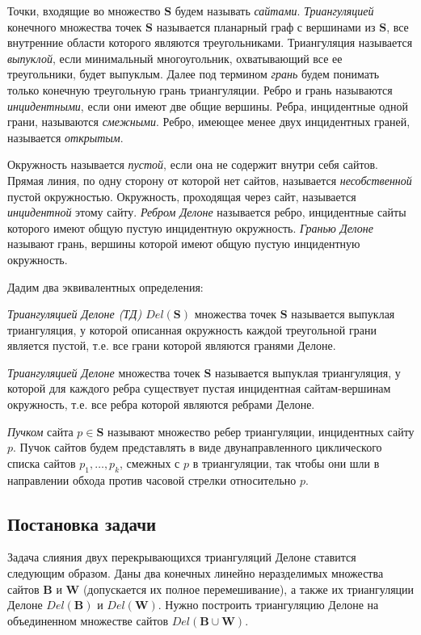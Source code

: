 \documentclass[12pt]{article}
\begin{document}
Точки, входящие во множество $\textbf{S}$ будем называть {\itshape сайтами}.
{\itshape Триангуляцией} конечного множества точек $\textbf{S}$ называется планарный граф с вершинами из $\textbf{S}$,
все внутренние области которого являются треугольниками.
Триангуляция называется {\itshape выпуклой}, если минимальный многоугольник, охватывающий все ее треугольники, будет выпуклым.
Далее под термином {\itshape грань} будем понимать только конечную треугольную грань триангуляции.
Ребро и грань называются {\itshape инцидентными}, если они имеют две общие вершины.
Ребра, инцидентные одной грани, называются {\itshape смежными}.
Ребро, имеющее менее двух инцидентных граней, называется {\itshape открытым}.

Окружность называется {\itshape пустой}, если она не содержит внутри себя сайтов.
Прямая линия, по одну сторону от которой нет сайтов, называется {\itshape несобственной} пустой окружностью.
Окружность, проходящая через сайт, называется {\itshape инцидентной} этому сайту.
{\itshape Ребром Делоне} называется ребро, инцидентные сайты которого имеют общую пустую инцидентную окружность.
{\itshape Гранью Делоне} называют грань, вершины которой имеют общую пустую инцидентную окружность.

Дадим два эквивалентных определения:

\begin{definition}
{\itshape Триангуляцией Делоне (ТД) $Del(\textbf{S})$} множества точек $\textbf{S}$ называется выпуклая триангуляция,
у которой описанная окружность каждой треугольной грани является пустой,
т.е. все грани которой являются гранями Делоне.
\end{definition}

\begin{definition}
{\itshape Триангуляцией Делоне} множества точек $\textbf{S}$ называется выпуклая триангуляция,
у которой для каждого ребра существует пустая инцидентная сайтам-вершинам окружность,
т.е. все ребра которой являются ребрами Делоне.
\end{definition}

{\itshape Пучком} сайта $p \in \textbf{S}$ называют множество ребер триангуляции, инцидентных сайту $p$.
Пучок сайтов будем представлять в виде двунаправленного циклического списка сайтов $p_1, \ldots, p_k$,
смежных с $p$ в триангуляции, так чтобы они шли в направлении обхода против часовой стрелки относительно $p$.

\subsection{Постановка задачи}
Задача слияния двух перекрывающихся триангуляций Делоне ставится следующим образом.
Даны два конечных линейно неразделимых множества сайтов $\textbf{B}$ и $\textbf{W}$ (допускается их полное перемешивание),
а также их триангуляции Делоне $Del(\textbf{B})$ и $Del(\textbf{W})$.
Нужно построить триангуляцию Делоне на объединенном множестве сайтов $Del(\textbf{B} \cup \textbf{W})$.
\end{document}
